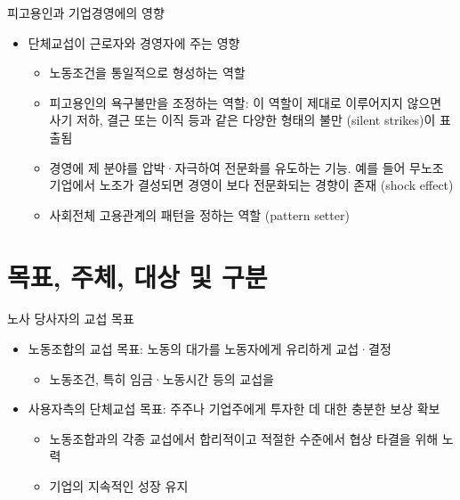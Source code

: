 \documentclass[aspectratio=169,xcolor=dvipsnames,handout]{beamer}
\begin{document}
\begin{frame}{피고용인과 기업경영에의 영향}
    \begin{itemize}[<+->]
        \item 단체교섭이 근로자와 경영자에 주는 영향
        \begin{itemize}[<+->]
            \item 노동조건을 통일적으로 형성하는 역할
            \item 피고용인의 욕구불만을 조정하는 역할: 이 역할이 제대로 이루어지지 않으면 사기 저하, 결근 또는 이직 등과 같은 다양한 형태의 불만 (silent strikes)이 표출됨
            \item 경영에 제 분야를 압박·자극하여 전문화를 유도하는 기능. 예를 들어 무노조 기업에서 노조가 결성되면 경영이 보다 전문화되는 경향이 존재 (shock effect)
            \item 사회전체 고용관계의 패턴을 정하는 역할 (pattern setter)
        \end{itemize}
    \end{itemize}
\end{frame}

\section{목표, 주체, 대상 및 구분}

\begin{frame}{노사 당사자의 교섭 목표}
    \begin{itemize}[<+->]
        \item 노동조합의 교섭 목표: 노동의 대가를 노동자에게 유리하게 교섭·결정
        \begin{itemize}[<+->]
            \item 노동조건, 특히 임금·노동시간 등의 교섭을
        \end{itemize}
            \item 사용자측의 단체교섭 목표: 주주나 기업주에게 투자한 데 대한 충분한 보상 확보
        \begin{itemize}[<+->]
            \item 노동조합과의 각종 교섭에서 합리적이고 적절한 수준에서 협상 타결을 위해 노력
            \item 기업의 지속적인 성장 유지
        \end{itemize}
    \end{itemize}
\end{frame}
\end{document}
